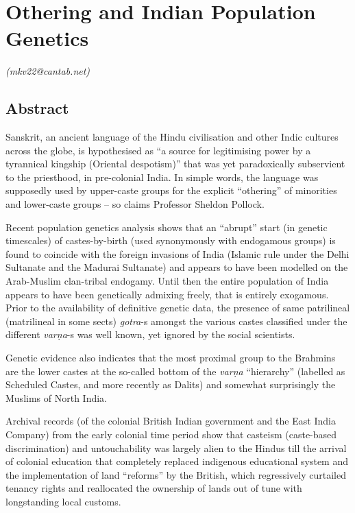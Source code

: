 
\chapter{Othering and Indian Population Genetics}\label{chapter10}


\begin{flushright}
\textit{(mkv22@cantab.net)}
\end{flushright}

\setcounter{endnote}{0}

\section*{Abstract}

Sanskrit, an ancient language of the Hindu civilisation and other Indic cultures across the globe, is hypothesised as “a source for legitimising power by a tyrannical kingship (Oriental despotism)” that was yet paradoxically subservient to the priesthood, in pre-colonial India. In simple words, the language was supposedly used by upper-caste groups for the explicit “othering” of minorities and lower-caste groups – so claims Professor Sheldon Pollock.

Recent population genetics analysis shows that an “abrupt” start (in genetic timescales) of castes-by-birth (used synonymously with endogamous groups) is found to coincide with the foreign invasions of India (Islamic rule under the Delhi Sultanate and the Madurai Sultanate) and appears to have been modelled on the Arab-Muslim clan-tribal endogamy. Until then the entire population of India appears to have been genetically admixing freely, that is entirely exogamous. Prior to the availability of definitive genetic data, the presence of same patrilineal (matrilineal in some sects) \textit{gotra}-s amongst the various castes classified under the different \textit{varṇa}-s was well known, yet ignored by the social scientists.

Genetic evidence also indicates that the most proximal group to the Brahmins are the lower castes at the so-called bottom of the \textit{varṇa} “hierarchy” (labelled as Scheduled Castes, and more recently as Dalits) and somewhat surprisingly the Muslims of North India.

Archival records (of the colonial British Indian government and the East India Company) from the early colonial time period show that casteism (caste-based discrimination) and untouchability was largely alien to the Hindus till the arrival of colonial education that completely replaced indigenous educational system and the implementation of land “reforms” by the British, which regressively curtailed tenancy rights and reallocated the ownership of lands out of tune with longstanding local customs.


